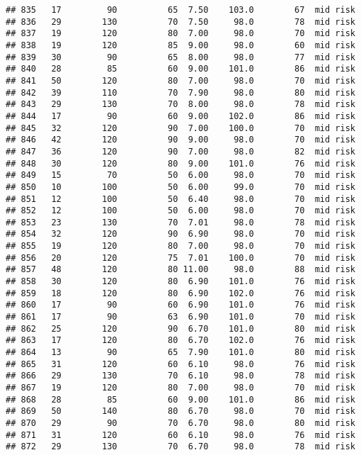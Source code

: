 \documentclass[
  ignorenonframetext,
]{beamer}
\begin{document}
\begin{frame}[fragile]
\begin{verbatim}
## 835   17         90          65  7.50    103.0        67  mid risk
## 836   29        130          70  7.50     98.0        78  mid risk
## 837   19        120          80  7.00     98.0        70  mid risk
## 838   19        120          85  9.00     98.0        60  mid risk
## 839   30         90          65  8.00     98.0        77  mid risk
## 840   28         85          60  9.00    101.0        86  mid risk
## 841   50        120          80  7.00     98.0        70  mid risk
## 842   39        110          70  7.90     98.0        80  mid risk
## 843   29        130          70  8.00     98.0        78  mid risk
## 844   17         90          60  9.00    102.0        86  mid risk
## 845   32        120          90  7.00    100.0        70  mid risk
## 846   42        120          90  9.00     98.0        70  mid risk
## 847   36        120          90  7.00     98.0        82  mid risk
## 848   30        120          80  9.00    101.0        76  mid risk
## 849   15         70          50  6.00     98.0        70  mid risk
## 850   10        100          50  6.00     99.0        70  mid risk
## 851   12        100          50  6.40     98.0        70  mid risk
## 852   12        100          50  6.00     98.0        70  mid risk
## 853   23        130          70  7.01     98.0        78  mid risk
## 854   32        120          90  6.90     98.0        70  mid risk
## 855   19        120          80  7.00     98.0        70  mid risk
## 856   20        120          75  7.01    100.0        70  mid risk
## 857   48        120          80 11.00     98.0        88  mid risk
## 858   30        120          80  6.90    101.0        76  mid risk
## 859   18        120          80  6.90    102.0        76  mid risk
## 860   17         90          60  6.90    101.0        76  mid risk
## 861   17         90          63  6.90    101.0        70  mid risk
## 862   25        120          90  6.70    101.0        80  mid risk
## 863   17        120          80  6.70    102.0        76  mid risk
## 864   13         90          65  7.90    101.0        80  mid risk
## 865   31        120          60  6.10     98.0        76  mid risk
## 866   29        130          70  6.10     98.0        78  mid risk
## 867   19        120          80  7.00     98.0        70  mid risk
## 868   28         85          60  9.00    101.0        86  mid risk
## 869   50        140          80  6.70     98.0        70  mid risk
## 870   29         90          70  6.70     98.0        80  mid risk
## 871   31        120          60  6.10     98.0        76  mid risk
## 872   29        130          70  6.70     98.0        78  mid risk

\end{verbatim}
\end{frame}
\end{document}
